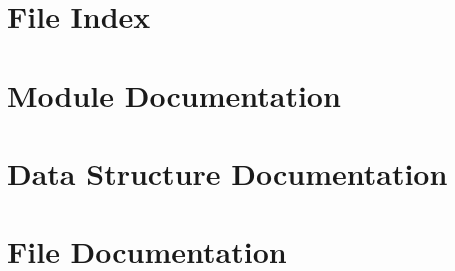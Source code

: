 \documentclass[twoside]{book}
\newcommand{\+}{\discretionary{\mbox{\scriptsize$\hookleftarrow$}}{}{}}
\begin{document}
\chapter{File Index}

\chapter{Module Documentation}



\chapter{Data Structure Documentation}


\chapter{File Documentation}














\newpage
{}
{}
\printindex
\end{document}
